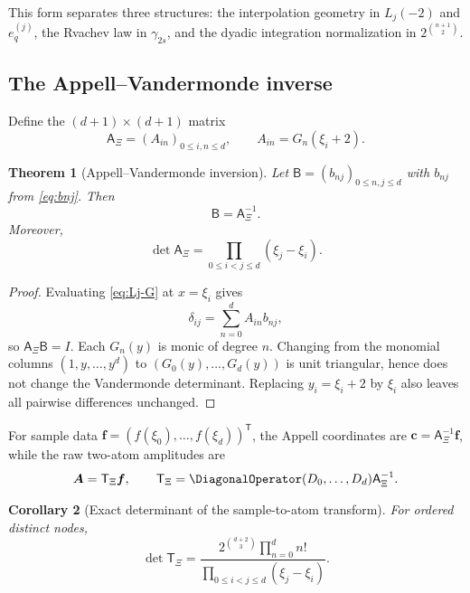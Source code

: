 \documentclass[11pt,oneside]{article}
\newtheorem{theorem}{Theorem}[section]
\newtheorem{corollary}[theorem]{Corollary}
\theoremstyle{definition}
\theoremstyle{remark}
\begin{document}
This form separates three structures: the interpolation geometry in
$L_j(-2)$ and $e_q^{(j)}$, the Rvachev law in $\gamma_{2s}$, and the dyadic
integration normalization in $2^{\binom{n+1}{2}}$.

\subsection{The Appell--Vandermonde inverse}
Define the $(d+1)\times(d+1)$ matrix
\begin{equation}
 \mathsf A_\Xi=(A_{in})_{0\le i,n\le d},
 \qquad A_{in}=G_n(\xi_i+2).
 \label{eq:Appell-Vandermonde}
\end{equation}

\begin{theorem}[Appell--Vandermonde inversion]
\label{thm:Appell-Vandermonde}
Let $\mathsf B=(b_{nj})_{0\le n,j\le d}$ with $b_{nj}$ from
\eqref{eq:bnj}.  Then
\begin{equation}
 \mathsf B=\mathsf A_\Xi^{-1}.
 \label{eq:B=Ainv}
\end{equation}
Moreover,
\begin{equation}
 \det\mathsf A_\Xi=\prod_{0\le i<j\le d}(\xi_j-\xi_i).
 \label{eq:detA}
\end{equation}
\end{theorem}

\begin{proof}
Evaluating \eqref{eq:Lj-G} at $x=\xi_i$ gives
\[
 \delta_{ij}=\sum_{n=0}^{d}A_{in}b_{nj},
\]
so $\mathsf A_\Xi\mathsf B=I$.  Each $G_n(y)$ is monic of degree $n$.
Changing from the monomial columns $(1,y,\ldots,y^d)$ to
$(G_0(y),\ldots,G_d(y))$ is unit triangular, hence does not change the
Vandermonde determinant.  Replacing $y_i=\xi_i+2$ by $\xi_i$ also leaves
all pairwise differences unchanged.
\end{proof}

For sample data $\bm f=(f(\xi_0),\ldots,f(\xi_d))^{\mathsf T}$, the Appell
coordinates are $\bm c=\mathsf A_\Xi^{-1}\bm f$, while the raw two-atom
amplitudes are
\begin{equation}
 \bm A=\mathsf T_\Xi\bm f,
 \qquad
 \mathsf T_\Xi=\DiagonalOperator(D_0,\ldots,D_d)\mathsf A_\Xi^{-1}.
 \label{eq:sample-to-atom}
\end{equation}

\begin{corollary}[Exact determinant of the sample-to-atom transform]
\label{cor:detT}
For ordered distinct nodes,
\begin{equation}
 \boxed{
 \det\mathsf T_\Xi
 =\frac{2^{\binom{d+2}{3}}\prod_{n=0}^{d}n!}
 {\prod_{0\le i<j\le d}(\xi_j-\xi_i)}.}
 \label{eq:detT}
\end{equation}
\end{corollary}
\end{document}
